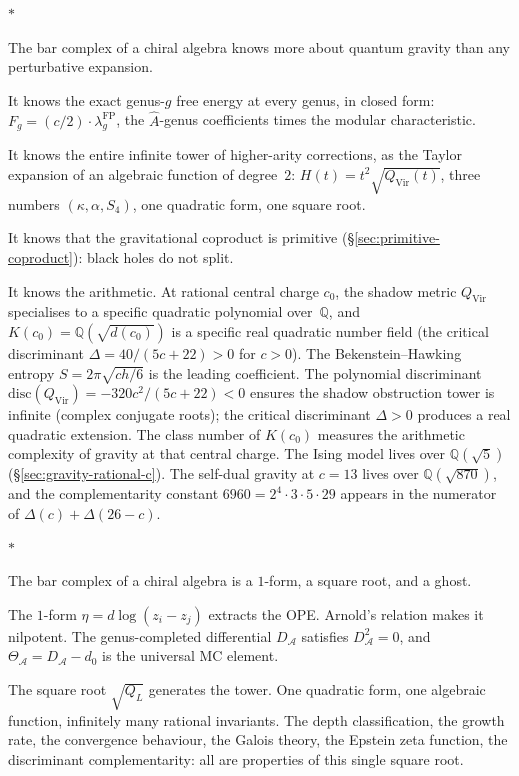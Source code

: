 \documentclass[11pt]{article}
\newcommand{\cA}{\mathcal{A}}
\newcommand{\Q}{\mathbb{Q}}
\newcommand{\sep}{\bigskip\begin{center}$*$\end{center}\medskip}
\begin{document}
\sep

The bar complex of a chiral algebra knows more about quantum
gravity than any perturbative expansion.

It knows the exact genus-$g$ free energy at every genus, in
closed form:
$F_g = (c/2) \cdot \lambda_g^{\mathrm{FP}}$, the
$\hat{A}$-genus coefficients times the modular characteristic.

It knows the entire infinite tower of higher-arity corrections,
as the Taylor expansion of an algebraic function of degree~$2$:
$H(t) = t^2\sqrt{Q_{\mathrm{Vir}}(t)}$, three numbers
$(\kappa, \alpha, S_4)$, one quadratic form, one square root.

It knows that the gravitational coproduct is primitive
(\S\ref{sec:primitive-coproduct}): black holes do not split.

It knows the arithmetic.  At rational central charge $c_0$,
the shadow metric $Q_{\mathrm{Vir}}$ specialises to a specific
quadratic polynomial over~$\Q$, and
$K(c_0) = \Q(\sqrt{d(c_0)})$ is a specific real quadratic
number field (the critical discriminant $\Delta = 40/(5c{+}22) > 0$
for $c > 0$).  The Bekenstein--Hawking entropy $S = 2\pi\sqrt{ch/6}$
is the leading coefficient.  The polynomial discriminant
$\mathrm{disc}(Q_{\mathrm{Vir}}) = -320c^2/(5c+22) < 0$ ensures
the shadow obstruction tower is infinite (complex conjugate roots); the
critical discriminant $\Delta > 0$ produces a real quadratic extension.
The class number of $K(c_0)$ measures the arithmetic complexity
of gravity at that central charge.  The Ising model lives over
$\Q(\sqrt{5})$ (\S\ref{sec:gravity-rational-c}).
The self-dual gravity at $c = 13$ lives over $\Q(\sqrt{870})$,
and the complementarity constant $6960 = 2^4 \cdot 3 \cdot 5
\cdot 29$ appears in the numerator of $\Delta(c) + \Delta(26{-}c)$.

\sep

The bar complex of a chiral algebra is a $1$-form, a square
root, and a ghost.

The $1$-form $\eta = d\log(z_i - z_j)$ extracts the OPE.
Arnold's relation makes it nilpotent.  The genus-completed
differential $D_\cA$ satisfies $D_\cA^2 = 0$, and
$\Theta_\cA = D_\cA - d_0$ is the universal MC element.

The square root $\sqrt{Q_L}$ generates the tower.  One
quadratic form, one algebraic function, infinitely many
rational invariants.  The depth classification, the growth
rate, the convergence behaviour, the Galois theory, the Epstein
zeta function, the discriminant complementarity: all
are properties of this single square root.
\end{document}
